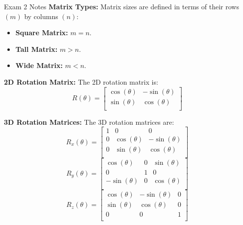 \begin{cheatsheet}{Exam 2 Notes}
    \textbf{Matrix Types:} Matrix sizes are defined in terms of their rows $(m)$ by columns $(n)$:
    \begin{itemize}
        \item \textbf{Square Matrix:} $m = n$.
        \item \textbf{Tall Matrix:} $m > n$.
        \item \textbf{Wide Matrix:} $m < n$.
    \end{itemize}

    \textbf{2D Rotation Matrix:} The 2D rotation matrix is:
    \begin{equation*}
        R(\theta) = 
        \begin{bmatrix}
            \cos{(\theta)} & -\sin{(\theta)} \\
            \sin{(\theta)} & \cos{(\theta)} \\
        \end{bmatrix}
    \end{equation*}

    \textbf{3D Rotation Matrices:} The 3D rotation matrices are:
    \begin{equation*}
        R_{x}(\theta) = 
        \begin{bmatrix}
            1 & 0 & 0 \\
            0 & \cos{(\theta)} & -\sin{(\theta)} \\
            0 & \sin{(\theta)} & \cos{(\theta)} \\
        \end{bmatrix}
    \end{equation*}
    \begin{equation*}
        R_{y}(\theta) = 
        \begin{bmatrix}
            \cos{(\theta)} & 0 & \sin{(\theta)} \\
            0 & 1 & 0 \\
            -\sin{(\theta)} & 0 & \cos{(\theta)} \\
        \end{bmatrix}
    \end{equation*}
    \begin{equation*}
        R_{z}(\theta) = 
        \begin{bmatrix}
            \cos{(\theta)} & -\sin{(\theta)} & 0 \\
            \sin{(\theta)} & \cos{(\theta)} & 0 \\
            0 & 0 & 1 \\
        \end{bmatrix}
    \end{equation*}


\end{cheatsheet}
